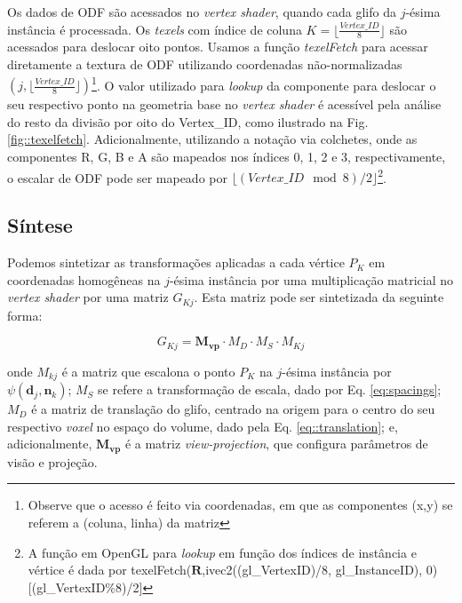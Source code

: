 Os dados de ODF são acessados no \textit{vertex shader}, quando cada glifo da $j$-ésima instância é processada. Os \textit{texels} com índice de coluna $K = \lfloor\frac{Vertex\_ID}{8} \rfloor$ são acessados para deslocar oito pontos. Usamos a função \textit{texelFetch} para acessar diretamente a textura de ODF utilizando coordenadas não-normalizadas $(j, \lfloor\frac{Vertex\_ID}{8} \rfloor)$\footnote{Observe que o acesso é feito via coordenadas, em que as componentes (x,y) se referem a (coluna, linha) da matriz}. O valor utilizado para \textit{lookup} da componente  para deslocar o seu respectivo ponto na geometria base no \textit{vertex shader} é acessível pela análise do resto da divisão por oito do Vertex\_ID, como ilustrado na Fig. \ref{fig::texelfetch}. Adicionalmente, utilizando a notação via colchetes, onde as componentes R, G, B e A são mapeados nos índices 0, 1, 2 e 3, respectivamente, o escalar de ODF pode ser mapeado por $\lfloor (Vertex\_ID \mod{8})/2 \rfloor$\footnote{A função em OpenGL para \textit{lookup} em função dos índices de instância e vértice é dada por texelFetch($\mathbf{R}$,ivec2((gl\_VertexID)/8, gl\_InstanceID), 0)[(gl\_VertexID\%8)/2]}.

\subsection{Síntese}

Podemos sintetizar as transformações aplicadas a cada vértice $P_K$ em coordenadas homogêneas na $j$-ésima instância por uma multiplicação matricial no \textit{vertex shader} por uma matriz $G_{Kj}$. Esta matriz pode ser sintetizada da seguinte forma:

\begin{equation}
    G_{Kj} = \mathbf{M_{vp}}\cdot M_D \cdot M_S \cdot M_{Kj}
\end{equation}

onde $M_{kj}$ é a matriz que escalona o ponto $P_K$ na $j$-ésima instância por $\psi(\mathbf{d}_j, \mathbf{n}_k)$; $M_S$ se refere a transformação de escala, dado por Eq. \ref{eq:spacings}; $M_D$ é a matriz de translação do glifo, centrado na origem para o centro do seu respectivo \textit{voxel} no espaço do volume, dado pela Eq. \ref{eq::translation}; e, adicionalmente, $\mathbf{M_{vp}}$ é a matriz \textit{view-projection}, que configura parâmetros de visão e projeção.
